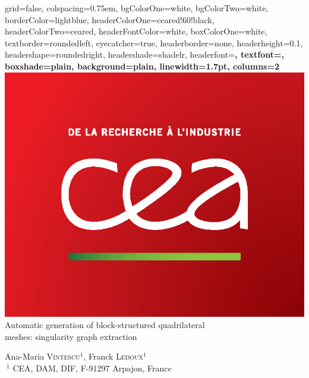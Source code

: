 \documentclass[a0paper,portrait, fontscale=0.33]{baposter}
\begin{document}
\begin{poster}
{  
            grid=false,
            colspacing=0.75em,
            bgColorOne=white,
            bgColorTwo=white,
            borderColor=lightblue,		%
            headerColorOne=ceared!60!black, 		%
            headerColorTwo=ceared,	%
            headerFontColor=white,		%
            boxColorOne=white, 		%
            textborder=roundedleft,
            eyecatcher=true,
           	headerborder=none,		%
            headerheight=0.1\textheight,
            headershape=roundedright,	%
            headershade=shadelr,
            headerfont=\Large\bf\textsc, %
            textfont={\setlength{\parindent}{1.5em}},
            boxshade=plain,
            background=plain,
            linewidth=1.7pt,
            columns=2
}
{\includegraphics[scale=0.4]{logo_cea}}
{Automatic generation of block-structured quadrilateral \\ \medskip meshes: singularity graph extraction
\bigskip}
{ 
  Ana-Maria \textsc{Vintescu}$^{1}$,
  Franck \textsc{Ledoux}$^{1}$\\
 \smallskip
  \small
  $~^1$ CEA, DAM, DIF, F-91297 Arpajon, France \hspace{2em}
  
}
\end{poster}
\end{document}
